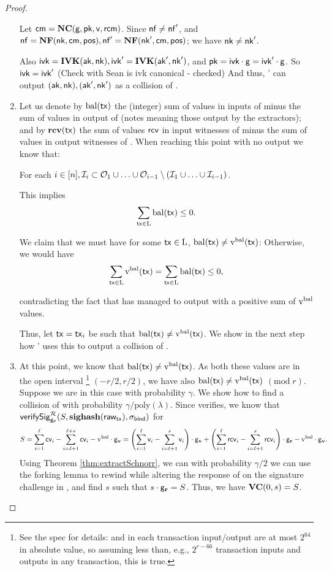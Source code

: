 \documentclass[11pt]{article}
\numberwithin{equation}{section} %
\numberwithin{figure}{section} %
\newcommand{\poly}{\ensuremath{\mathrm{poly}(\lambda)}\xspace}
\begin{document}
\begin{proof}
\begin{enumerate}
Let $\mathsf{cm}=\mathbf{NC}(\mathsf{g},\mathsf{pk},\mathsf{v},\mathsf{rcm})$.
Since $\mathsf{nf}\neq \mathsf{nf}'$,
and 
$\mathsf{nf} = \mathbf{NF}(\mathsf{nk},\mathsf{cm},\mathsf{pos}),\mathsf{nf}'= \mathbf{NF}(\mathsf{nk}',\mathsf{cm},\mathsf{pos})$;
we have  $\mathsf{nk} \neq\mathsf{nk}'$.

Also $\mathsf{ivk} = \mathbf{IVK}(\mathsf{ak},\mathsf{nk}), \mathsf{ivk}'=\mathbf{IVK}(\mathsf{ak}',\mathsf{nk}')$,
and $\mathsf{pk}=\mathsf{ivk}\cdot \mathsf{g} = \mathsf{ivk}'\cdot \mathsf{g}$.
So $\mathsf{ivk}=\mathsf{ivk}'$ (Check with Sean is ivk canonical - checked)
And thus, \adv' can output $(\mathsf{ak},\mathsf{nk}),(\mathsf{ak}',\mathsf{nk}')$ as a collision of \IVK.


\item Let us denote by $\mathrm{bal}(\mathsf{tx})$ the (integer) sum of values in inputs of \tx minus the sum of values in output of \tx (notes meaning those output by the extractors);
and by $\mathrm{\mathbf{rcv}}(\mathsf{tx})$ the sum of values $\mathsf{rcv}$ in input witnesses of \tx minus the sum of values \rcv in output witnesses of \tx.
When reaching this point with no output we know that:

For each $i\in [n], {\mathcal{I}}_i \subset {\mathcal{O}}_1\cup\ldots\cup{\mathcal{O}}_{i-1}\setminus({\mathcal{I}}_1\cup\ldots\cup{\mathcal{I}}_{i-1})$.

This implies 
\[\sum_{\mathsf{tx}\in\mathrm{L}} \mathrm{bal}(\mathsf{tx}) \leq 0.\]

We claim that we must have for some $\mathsf{tx}\in\mathrm{L}$, $\mathrm{bal}(\mathsf{tx})\neq \mathrm{v^{bal}}(\mathsf{tx})$:
Otherwise, we would have
\[\sum_{\mathsf{tx}\in \mathrm{L}} \mathrm{v^{bal}}(\mathsf{tx}) = \sum_{\mathsf{tx}\in\mathrm{L}} \mathrm{bal}(\mathsf{tx}) \leq 0,\]

contradicting the fact that \adv has managed to output \ledger with a positive sum of $\mathrm{v^{bal}}$ values.

Thus, let $\mathsf{tx}=\mathsf{tx}_i$ be such that $\mathrm{bal}(\mathsf{tx})\neq\mathrm{v^{bal}}(\mathsf{tx})$. We show in the next step how \adv' uses this to output a collision of \valcom.

\item At this point, we know that $\mathrm{bal}(\mathsf{tx}) \neq \mathrm{v^{bal}}(\mathsf{tx})$. As both these values are in the open interval \footnote{See 
the spec for details: \vbal and \val in each transaction input/output are at most $2^{64}$ in absolute value, so assuming 
less than, e.g., $2^{r-66}$ transaction inputs and outputs in any transaction, this is true.} $(-r/2,r/2)$, we have also $\mathrm{bal}(\mathsf{tx})\neq \mathrm{v^{bal}}(\mathsf{tx})$ $(\mathrm{mod}\;  r)$.
Suppose we are in this case with probability $\gamma$. We show how to find a collision of \valcom with probability
$\gamma/\poly$. Since \tx verifies, we know that
$\mathsf{verifySig}^{\mathcal R}_{\mathsf{g}_\mathbf{r}}(S,\mathbf{sighash}(\mathsf{raw_{tx}}),\sigma_{\mathsf{bind}})$ for 
\[S=\sum_{i=1}^\ell \mathsf{cv}_i - \sum_{i=\ell+1}^{\ell+s}\mathsf{cv}_i-\mathrm{v^{bal}}\cdot \mathsf{g}_{\mathbf{v}}= \left(\sum_{i=1}^{\ell} \mathsf{v}_i-\sum_{i=\ell+1}^{s} \mathsf{v}_i\right)\cdot \mathsf{g}_{\mathbf{v}} + \left(\sum_{i=1}^{\ell} \mathsf{rcv}_i-\sum_{i=\ell+1}^{s} \mathsf{rcv}_i\right)\cdot \mathsf{g}_\mathbf{r}  - \mathrm{v^{bal}}\cdot \mathsf{g}_{\mathbf{v}}.\]
Using Theorem \ref{thm:extractSchnorr}, we can
with probability $\gamma/2$ we can use the forking lemma to rewind \adv while altering the response of \RO on the signature challenge in \sigval, and find $s$ such that $s\cdot \mathsf{g}_\mathbf{r} = S$.
Thus, we have $\mathbf{VC}(0,s) = S$.


\end{enumerate}
\end{proof}
\end{document}
